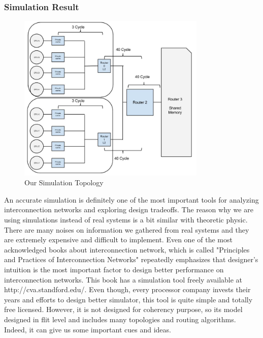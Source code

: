 \subsubsection*{Simulation Result}
	\begin{figure}[h!]
	    \centering
	    \includegraphics[width=0.8\textwidth]{img/simulation.jpg}
	    \caption{Our Simulation Topology\cite{0122007514}}
	    \label{fig:simulation}
	\end{figure}
An accurate simulation is definitely one of the most important tools for analyzing interconnection networks and exploring design tradeoffs. The reason why we are using simulations instead of real systems is a bit similar with theoretic physic. There are many noises on information we gathered from real systems and they are extremely expensive and difficult to implement. Even one of the most acknowledged books about interconnection network, which is called "Principles and Practices of Interconnection Networks" repeatedly emphasizes that designer's intuition is the most important factor to design better performance on interconnection networks\cite{0122007514}. This book has a simulation tool freely available at http://cva.standford.edu/\cite{jiang2013detailed}. Even though, every processor company invests their years and efforts to design better simulator, this tool is quite simple and totally free licensed. However, it is not designed for coherency purpose, so its model designed in flit level and includes many topologies and routing algorithms. Indeed, it can give us some important cues and ideas. 

